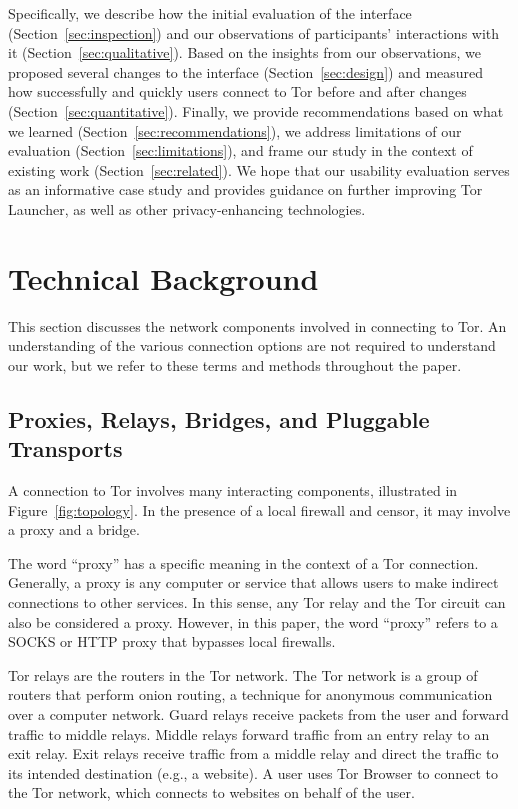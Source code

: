 \documentclass[USenglish,oneside,twocolumn]{article}
\begin{document}
Specifically, we describe how the initial evaluation of the interface (Section~\ref{sec:inspection}) and our observations of participants' interactions with it (Section~\ref{sec:qualitative}).
Based on the insights from our observations, we proposed several changes to the interface (Section~\ref{sec:design}) and measured how successfully and quickly users connect to Tor before and after changes (Section~\ref{sec:quantitative}).
Finally, we provide recommendations based on what we learned (Section~\ref{sec:recommendations}), we address limitations of our evaluation (Section~\ref{sec:limitations}), and frame our study in the context of existing work (Section~\ref{sec:related}).
We hope that our usability evaluation serves as an informative case study and provides guidance on further improving Tor Launcher, as well as other privacy-enhancing technologies.


\section{Technical Background}
\label{sec:background}
This section discusses the network components involved in connecting to Tor.
An understanding of the various connection options are not required to understand our work, but we refer to these terms and methods throughout the paper.


\subsection{Proxies, Relays, Bridges, and Pluggable Transports} 

A connection to Tor involves many interacting components,
illustrated in Figure~\ref{fig:topology}.
In the presence of a local firewall and censor, it may involve a proxy and a bridge.

The word ``proxy'' has a specific meaning in the context of a Tor connection.
Generally, a proxy is any computer or service that allows users to make indirect connections to other services. In this sense, any Tor relay and the Tor circuit can also be considered a proxy. However, in this paper, the word ``proxy'' refers to a SOCKS or HTTP proxy that bypasses local firewalls.

Tor relays are the routers in the Tor network. The Tor network is a group of routers that perform onion routing, a technique for anonymous communication over a computer network.  Guard relays receive packets from the user and forward traffic to middle relays. Middle relays forward traffic from an entry relay to an exit relay. Exit relays receive traffic from a middle relay and direct the traffic to its intended destination (e.g., a website).  A user uses Tor Browser to connect to the Tor network, which connects to websites on behalf of the user. 
\end{document}
